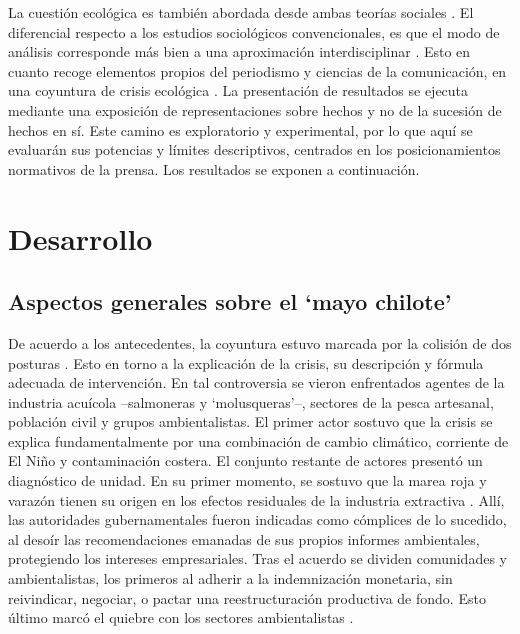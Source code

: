 \documentclass{textolivre}
\begin{document}
La cuestión ecológica es también abordada desde ambas teorías sociales
\cite{arboleda,billi2017,Folke2016,Foster2016,Gunderson2019,Mascareo2018b}.
El diferencial
respecto a los estudios sociológicos convencionales, es que el modo de análisis
corresponde más bien a una aproximación interdisciplinar \cite{becerra2014,Osborne2015}.
Esto en cuanto recoge elementos propios del periodismo y ciencias de la
comunicación, en una coyuntura de crisis ecológica \cite{Luhmann2012}. La
presentación de resultados se ejecuta mediante una exposición de representaciones
sobre hechos y no de la sucesión de hechos en sí. Este camino es exploratorio y
experimental, por lo que aquí se evaluarán sus potencias y límites descriptivos, centrados
en los posicionamientos normativos de la prensa. Los resultados se exponen a
continuación.




\section{Desarrollo}\label{sec-desarrollo}

\subsection{Aspectos generales sobre el ‘mayo chilote’}\label{sec-aspec-generales}
De acuerdo a los antecedentes, la coyuntura estuvo marcada por la colisión de dos
posturas \cite{Mascareo2018b}. Esto en torno a la explicación de la crisis, su
descripción y fórmula adecuada de intervención. En tal controversia se vieron
enfrentados agentes de la industria acuícola --salmoneras y ‘molusqueras’--, sectores de
la pesca artesanal, población civil y grupos ambientalistas. El primer actor sostuvo que la
crisis se explica fundamentalmente por una combinación de cambio climático, corriente de
El Niño y contaminación costera. El conjunto restante de actores presentó un diagnóstico
de unidad. En su primer momento, se sostuvo que la marea roja y varazón tienen su
origen en los efectos residuales de la industria extractiva \cite{roman2016}. Allí, las
autoridades gubernamentales fueron indicadas como cómplices de lo sucedido, al desoír
las recomendaciones emanadas de sus propios informes ambientales, protegiendo los
intereses empresariales. Tras el acuerdo se dividen comunidades y ambientalistas, los
primeros al adherir a la indemnización monetaria, sin reivindicar, negociar, o pactar una
reestructuración productiva de fondo. Esto último marcó el quiebre con los sectores
ambientalistas \cite{ciudadano2016}.
\end{document}

